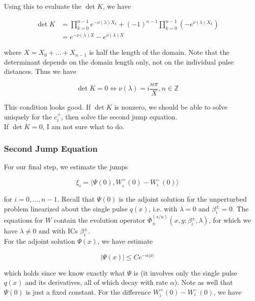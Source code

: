 \documentclass[12pt]{article}
\def\Z{{\mathbb Z}}
\begin{document}
Using this to evaluate the $\det K$, we have

\begin{align*}
\det K &= \prod_{k = 0}^{n-1} e^{-\nu(\lambda)X_k} + (-1)^{n-1} \prod_{k = 0}^{n-1} (-e^{\nu(\lambda)X_k}) \\
&= e^{-\nu(\lambda) X} - e^{\nu(\lambda) X}
\end{align*}

where $X = X_0 + \dots + X_{n-1}$ is half the length of the domain. Note that the determinant depends on the domain length only, not on the individual pulse distances. Thus we have

\[
\det K = 0 \iff \nu(\lambda) = i \frac{n \pi}{X}, n \in \Z
\]

This condition looks good. If $\det K$ is nonzero, we should be able to solve uniquely for the $c_i^+$, then solve the second jump equation.\\

If $\det K = 0$, I am not sure what to do.\\

\subsubsection{Second Jump Equation}

For our final step, we estimate the jumps

\begin{equation}
\xi_i = \langle \Psi(0), W_i^+(0) - W_i^-(0) \rangle 
\end{equation}

for $i = 0, \dots, n-1$. Recall that $\Psi(0)$ is the adjoint solution for the unperturbed problem linearized about the single pulse $q(x)$, i.e. with $\lambda = 0$ and $\beta_i^\pm = 0$. The equations for $W$ contain the evolution operator $\Phi^{(s/u)}_\pm(x, y; \beta_i^\pm, \lambda)$, for which we have $\lambda \neq 0$ and with ICs $\beta_i^\pm$.\\

For the adjoint solution $\Psi(x)$, we have estimate 

\begin{equation}
|\Psi(x)| \leq C e^{-\alpha|x|}
\end{equation}

which holds since we know exactly what $\Psi$ is (it involves only the single pulse $q(x)$ and its derivatives, all of which decay with rate $\alpha$). Note as well that $\Psi(0)$ is just a fixed constant. For the difference $W_i^+(0) - W_i^-(0)$, we have
\end{document}
